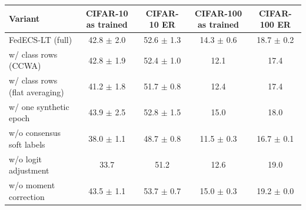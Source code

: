 \begin{tabular}{lcccc}
\toprule
Variant & CIFAR-10 as trained & CIFAR-10 ER & CIFAR-100 as trained & CIFAR-100 ER\\
\midrule
FedECS-LT (full) & 42.8 $\pm$ 2.0 & 52.6 $\pm$ 1.3 & 14.3 $\pm$ 0.6 & 18.7 $\pm$ 0.2\\
w/ class rows (CCWA) & 42.8 $\pm$ 1.9 & 52.4 $\pm$ 1.0 & 12.1 & 17.4\\
w/ class rows (flat averaging) & 41.2 $\pm$ 1.8 & 51.7 $\pm$ 0.8 & 12.4 & 17.4\\
w/ one synthetic epoch & 43.9 $\pm$ 2.5 & 52.8 $\pm$ 1.5 & 15.0 & 18.0\\
w/o consensus soft labels & 38.0 $\pm$ 1.1 & 48.7 $\pm$ 0.8 & 11.5 $\pm$ 0.3 & 16.7 $\pm$ 0.1\\
w/o logit adjustment & 33.7 & 51.2 & 12.6 & 19.0\\
w/o moment correction & 43.5 $\pm$ 1.1 & 53.7 $\pm$ 0.7 & 15.0 $\pm$ 0.3 & 19.2 $\pm$ 0.0\\
\bottomrule
\end{tabular}
